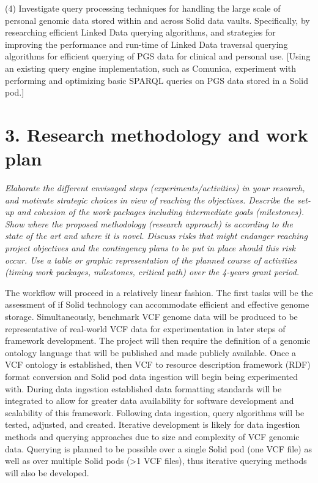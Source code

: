 \documentclass{article}
\begin{document}
(4) Investigate query processing techniques for handling the large scale of personal genomic data stored within and across Solid data vaults. Specifically, by researching efficient Linked Data querying algorithms, and strategies for improving the performance and run-time of Linked Data traversal querying algorithms for efficient querying of PGS data for clinical and personal use. [Using an existing query engine implementation, such as Comunica, experiment with performing and optimizing basic SPARQL queries on PGS data stored in a Solid pod.]




\section{3. Research methodology and work plan}
\textit{Elaborate the different envisaged steps (experiments/activities) in your research, and motivate strategic choices in view of reaching the objectives. Describe the set-up and cohesion of the work packages including intermediate goals (milestones).
Show where the proposed methodology (research approach) is according to the state of the art and where it is novel. Discuss risks that might endanger reaching project objectives and the contingency plans to be put in place should this risk occur.
Use a table or graphic representation of the planned course of activities (timing work packages, milestones, critical path) over the 4-years grant period.}

The workflow will proceed in a relatively linear fashion. The first tasks will be the assessment of if Solid technology can accommodate efficient and effective genome storage. Simultaneously, benchmark VCF genome data will be produced to be representative of real-world VCF data for experimentation in later steps of framework development. The project will then require the definition of a genomic ontology language that will be published and made publicly available. Once a VCF ontology is established, then VCF to resource description framework (RDF) format conversion and Solid pod data ingestion will begin being experimented with. During data ingestion established data formatting standards will be integrated to allow for greater data availability for software development and scalability of this framework. Following data ingestion, query algorithms will be tested, adjusted, and created. Iterative development is likely for data ingestion methods and querying approaches due to size and complexity of VCF genomic data. Querying is planned to be possible over a single Solid pod (one VCF file) as well as over multiple Solid pods (>1 VCF files), thus iterative querying methods will also be developed. 
\end{document}
